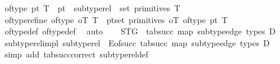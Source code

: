 \begin{isabellebody}
\ {\isachardoublequoteopen}of{\isacharunderscore}{\kern0pt}type{}\ pt\ T\ {\isasymlongleftrightarrow}\ pt\ {\isasymin}\ subtype{\isacharunderscore}{\kern0pt}rel\isactrlsup {\isacharasterisk}{\kern0pt}\ {\isacharbackquote}{\kern0pt}{\isacharbackquote}{\kern0pt}\ set\ {\isacharparenleft}{\kern0pt}primitives\ T{\isacharparenright}{\kern0pt}{\isachardoublequoteclose}\isanewline
\isanewline
\ \ \isamarkupfalse%
\ of{\isacharunderscore}{\kern0pt}type{\isacharunderscore}{\kern0pt}refine{}{\isacharcolon}{\kern0pt}\ {\isachardoublequoteopen}of{\isacharunderscore}{\kern0pt}type\ oT\ T\ {\isasymlongleftrightarrow}\ {\isacharparenleft}{\kern0pt}{\isasymforall}pt{\isasymin}set\ {\isacharparenleft}{\kern0pt}primitives\ oT{\isacharparenright}{\kern0pt}{\isachardot}{\kern0pt}\ of{\isacharunderscore}{\kern0pt}type{}\ pt\ T{\isacharparenright}{\kern0pt}{\isachardoublequoteclose}\isanewline
%
\isadelimproof
\ \ \ \ %
\endisadelimproof
%
\isatagproof
{}\isamarkupfalse%
\ of{\isacharunderscore}{\kern0pt}type{\isacharunderscore}{\kern0pt}def\ of{\isacharunderscore}{\kern0pt}type{}{\isacharunderscore}{\kern0pt}def\ \isamarkupfalse%
\ auto%
\endisatagproof
{\isafoldproof}%
%
\isadelimproof
\isanewline
%
\endisadelimproof
\isanewline
\ \ \isamarkupfalse%
\ {\isachardoublequoteopen}STG\ {\isasymequiv}\ {\isacharparenleft}{\kern0pt}tab{\isacharunderscore}{\kern0pt}succ\ {\isacharparenleft}{\kern0pt}map\ subtype{\isacharunderscore}{\kern0pt}edge\ {\isacharparenleft}{\kern0pt}types\ D{\isacharparenright}{\kern0pt}{\isacharparenright}{\kern0pt}{\isacharparenright}{\kern0pt}{\isachardoublequoteclose}\isanewline
\isanewline
\ \ \isamarkupfalse%
\ subtype{\isacharunderscore}{\kern0pt}rel{\isacharunderscore}{\kern0pt}impl{\isacharcolon}{\kern0pt}\ {\isachardoublequoteopen}subtype{\isacharunderscore}{\kern0pt}rel\ {\isacharequal}{\kern0pt}\ E{\isacharunderscore}{\kern0pt}of{\isacharunderscore}{\kern0pt}succ\ {\isacharparenleft}{\kern0pt}tab{\isacharunderscore}{\kern0pt}succ\ {\isacharparenleft}{\kern0pt}map\ subtype{\isacharunderscore}{\kern0pt}edge\ {\isacharparenleft}{\kern0pt}types\ D{\isacharparenright}{\kern0pt}{\isacharparenright}{\kern0pt}{\isacharparenright}{\kern0pt}{\isachardoublequoteclose}\isanewline
%
\isadelimproof
\ \ \ \ %
\endisadelimproof
%
\isatagproof
{}\isamarkupfalse%
\ {\isacharparenleft}{\kern0pt}simp\ add{\isacharcolon}{\kern0pt}\ tab{\isacharunderscore}{\kern0pt}succ{\isacharunderscore}{\kern0pt}correct\ subtype{\isacharunderscore}{\kern0pt}rel{\isacharunderscore}{\kern0pt}def{\isacharparenright}{\kern0pt}%

\end{isabellebody}
